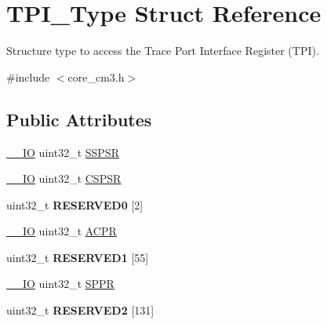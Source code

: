 \hypertarget{struct_t_p_i___type}{}\section{T\+P\+I\+\_\+\+Type Struct Reference}
\label{struct_t_p_i___type}


Structure type to access the Trace Port Interface Register (T\+PI).  




{\ttfamily \#include $<$core\+\_\+cm3.\+h$>$}

\subsection*{Public Attributes}
\begin{DoxyCompactItemize}
\item 
\hyperlink{core__sc300_8h_aec43007d9998a0a0e01faede4133d6be}{\+\_\+\+\_\+\+IO} uint32\+\_\+t \hyperlink{struct_t_p_i___type_a158e9d784f6ee6398f4bdcb2e4ca0912}{S\+S\+P\+SR}
\item 
\hyperlink{core__sc300_8h_aec43007d9998a0a0e01faede4133d6be}{\+\_\+\+\_\+\+IO} uint32\+\_\+t \hyperlink{struct_t_p_i___type_aa723ef3d38237aa2465779b3cc73a94a}{C\+S\+P\+SR}
\item 
uint32\+\_\+t {\bfseries R\+E\+S\+E\+R\+V\+E\+D0} \mbox{[}2\mbox{]}\hypertarget{struct_t_p_i___type_ad331234edd4a834f478e67bd979dc909}{}\label{struct_t_p_i___type_ad331234edd4a834f478e67bd979dc909}

\item 
\hyperlink{core__sc300_8h_aec43007d9998a0a0e01faede4133d6be}{\+\_\+\+\_\+\+IO} uint32\+\_\+t \hyperlink{struct_t_p_i___type_ad75832a669eb121f6fce3c28d36b7fab}{A\+C\+PR}
\item 
uint32\+\_\+t {\bfseries R\+E\+S\+E\+R\+V\+E\+D1} \mbox{[}55\mbox{]}\hypertarget{struct_t_p_i___type_a1626c5caf1c386f81ca01eb0daea2e51}{}\label{struct_t_p_i___type_a1626c5caf1c386f81ca01eb0daea2e51}

\item 
\hyperlink{core__sc300_8h_aec43007d9998a0a0e01faede4133d6be}{\+\_\+\+\_\+\+IO} uint32\+\_\+t \hyperlink{struct_t_p_i___type_a3eb655f2e45d7af358775025c1a50c8e}{S\+P\+PR}
\item 
uint32\+\_\+t {\bfseries R\+E\+S\+E\+R\+V\+E\+D2} \mbox{[}131\mbox{]}\hypertarget{struct_t_p_i___type_acc0bbc252ec6ffa1db1a40cd8dd41b95}{}\label{struct_t_p_i___type_acc0bbc252ec6ffa1db1a40cd8dd41b95}


\end{DoxyCompactItemize}
